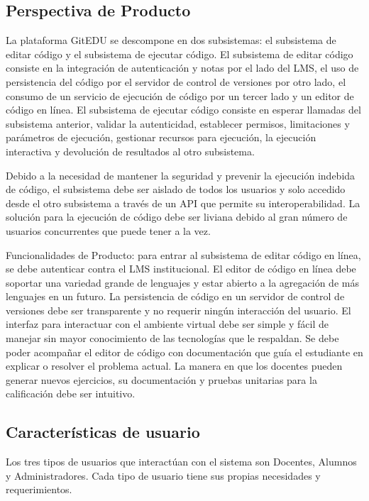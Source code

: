 \subsection{Perspectiva de Producto}
La plataforma GitEDU se descompone en dos subsistemas: el subsistema de editar código y el subsistema de ejecutar código. El subsistema de editar código consiste en la integración de autenticación y notas por el lado del LMS, el uso de persistencia del código por el servidor de control de versiones por otro lado, el consumo de un servicio de ejecución de código por un tercer lado y un editor de código en línea. El subsistema de ejecutar código consiste en esperar llamadas del subsistema anterior, validar la autenticidad, establecer permisos, limitaciones y parámetros de ejecución, gestionar recursos para ejecución, la ejecución interactiva y devolución de resultados al otro subsistema.

Debido a la necesidad de mantener la seguridad y prevenir la ejecución indebida de código, el subsistema debe ser aislado de todos los usuarios y solo accedido desde el otro subsistema a través de un API que permite su interoperabilidad. La solución para la ejecución de código debe ser liviana debido al gran número de usuarios concurrentes que puede tener a la vez.

Funcionalidades de Producto: para entrar al subsistema de editar código en línea, se debe autenticar contra el LMS institucional. El editor de código en línea debe soportar una variedad grande de lenguajes y estar abierto a la agregación de más lenguajes en un futuro. La persistencia de código en un servidor de control de versiones debe ser transparente y no requerir ningún interacción del usuario. El interfaz para interactuar con el ambiente virtual debe ser simple y fácil de manejar sin mayor conocimiento de las tecnologías que le respaldan. Se debe poder acompañar el editor de código con documentación que guía el estudiante en explicar o resolver el problema actual. La manera en que los docentes pueden generar nuevos ejercicios, su documentación y pruebas unitarias para la calificación debe ser intuitivo.

\subsection{Características de usuario}
Los tres tipos de usuarios que interactúan con el sistema son Docentes, Alumnos y Administradores. Cada tipo de usuario tiene sus propias necesidades y requerimientos.

